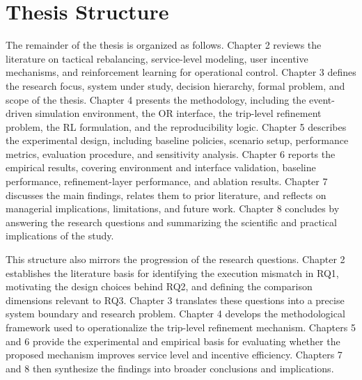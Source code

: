 \section{Thesis Structure}
The remainder of the thesis is organized as follows. Chapter 2 reviews the literature on tactical rebalancing, service-level modeling, user incentive mechanisms, and reinforcement learning for operational control. Chapter 3 defines the research focus, system under study, decision hierarchy, formal problem, and scope of the thesis. Chapter 4 presents the methodology, including the event-driven simulation environment, the OR interface, the trip-level refinement problem, the RL formulation, and the reproducibility logic. Chapter 5 describes the experimental design, including baseline policies, scenario setup, performance metrics, evaluation procedure, and sensitivity analysis. Chapter 6 reports the empirical results, covering environment and interface validation, baseline performance, refinement-layer performance, and ablation results. Chapter 7 discusses the main findings, relates them to prior literature, and reflects on managerial implications, limitations, and future work. Chapter 8 concludes by answering the research questions and summarizing the scientific and practical implications of the study.

This structure also mirrors the progression of the research questions. Chapter 2 establishes the literature basis for identifying the execution mismatch in RQ1, motivating the design choices behind RQ2, and defining the comparison dimensions relevant to RQ3. Chapter 3 translates these questions into a precise system boundary and research problem. Chapter 4 develops the methodological framework used to operationalize the trip-level refinement mechanism. Chapters 5 and 6 provide the experimental and empirical basis for evaluating whether the proposed mechanism improves service level and incentive efficiency. Chapters 7 and 8 then synthesize the findings into broader conclusions and implications.
